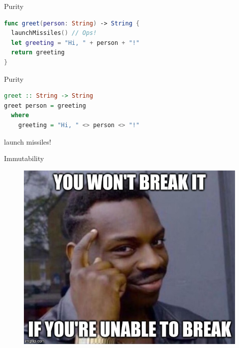 \documentclass[aspectratio=169]{beamer}
\begin{document}
\begin{frame}[fragile,t]
    \vspace{0.8em}
    \Huge{Purity}

    \begin{lstlisting}[language=Swift]
func greet(person: String) -> String {
  launchMissiles() // Ops!
  let greeting = "Hi, " + person + "!"
  return greeting
}
    \end{lstlisting}
\end{frame}

\begin{frame}[fragile,t]
    \vspace{0.8em}
    \Huge{Purity}

    \begin{lstlisting}[language=Haskell]
greet :: String -> String
greet person = greeting
  where
    greeting = "Hi, " <> person <> "!"
    \end{lstlisting}
    \vspace{0.8em}
    \huge{ launch missiles!}
\end{frame}

\begin{frame}[t]
    \vspace{0.8em}
    \Huge{Immutability}

    \centering
        \begin{figure}[b]
        \includegraphics[scale=0.35]{img/smart.jpg}
        \end{figure}
\end{frame}
\end{document}
